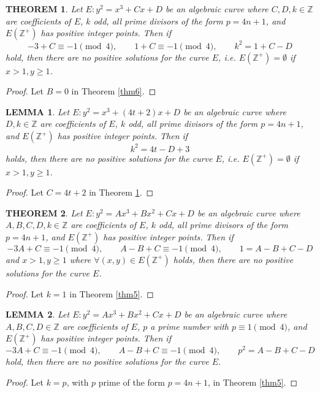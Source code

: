 \documentclass[11pt]{amsart}
\newtheorem{theorem}{THEOREM}
\newtheorem{lemma}{LEMMA}
\begin{document}
\begin{theorem}\label{thm7}
Let $E: y^2=x^3+Cx+D$ be an algebraic curve where $C,D,k\in\mathbb{Z}$ are coefficients of $E$, $k$ odd, all prime divisors of the form $p=4n+1$, and $E(\mathbb{Z}^+)$ has positive integer points. Then if
\[
-3+C\equiv-1\pmod4,\qquad 1+C\equiv-1\pmod4,\qquad k^2=1+C-D
\]
hold, then there are no positive solutions for the curve $E$, i.e. $E(\mathbb{Z}^+)=\emptyset$ if $x>1,y\ge1$.
\end{theorem}
\begin{proof}
Let $B=0$ in Theorem \ref{thm6}.
\end{proof}

\begin{lemma}\label{lem1}
Let $E: y^2=x^3+(4t+2)x+D$ be an algebraic curve where $D,k\in\mathbb{Z}$ are coefficients of $E$, $k$ odd, all prime divisors of the form $p=4n+1$, and $E(\mathbb{Z}^+)$ has positive integer points. Then if
\[
k^2 = 4t-D+3
\]
holds, then there are no positive solutions for the curve $E$, i.e. $E(\mathbb{Z}^+)=\emptyset$ if $x>1,y\ge1$.
\end{lemma}
\begin{proof}
Let $C=4t+2$ in Theorem \ref{thm7}.
\end{proof}

\begin{theorem}\label{thm8}
Let $E: y^2=Ax^3+Bx^2+Cx+D$ be an algebraic curve where $A,B,C,D,k\in\mathbb{Z}$ are coefficients of $E$, $k$ odd, all prime divisors of the form $p=4n+1$, and $E(\mathbb{Z}^+)$ has positive integer points. Then if
\[
-3A+C\equiv-1\pmod4,\qquad A-B+C\equiv-1\pmod4,\qquad 1=A-B+C-D
\]
and $x>1,y\ge1$ where $\forall(x,y)\in E(\mathbb{Z}^+)$ holds, then there are no positive solutions for the curve $E$.
\end{theorem}
\begin{proof}
Let $k=1$ in Theorem \ref{thm5}.
\end{proof}

\begin{lemma}\label{lem2}
Let $E: y^2=Ax^3+Bx^2+Cx+D$ be an algebraic curve where $A,B,C,D\in\mathbb{Z}$ are coefficients of $E$, $p$ a prime number with $p\equiv1\pmod4$, and $E(\mathbb{Z}^+)$ has positive integer points. Then if
\[
-3A+C\equiv-1\pmod4,\qquad A-B+C\equiv-1\pmod4,\qquad p^2=A-B+C-D
\]
hold, then there are no positive solutions for the curve $E$.
\end{lemma}
\begin{proof}
Let $k=p$, with $p$ prime of the form $p=4n+1$, in Theorem \ref{thm5}.
\end{proof}
\end{document}
